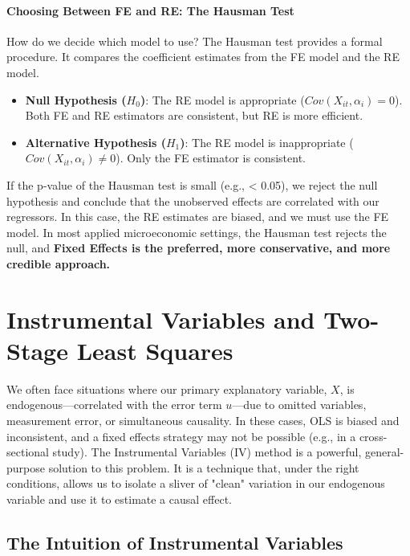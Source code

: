 \documentclass{article}
\providecommand{\tightlist}{
  \setlength{\itemsep}{0pt}
  \setlength{\parskip}{0pt}}
\begin{document}
\paragraph{Choosing Between FE and RE: The Hausman Test}
How do we decide which model to use? The 
Hausman test
 provides a formal procedure. It compares the coefficient estimates from the FE model and the RE model.
\begin{itemize}
    \tightlist
    \item \textbf{Null Hypothesis ($H_0$)}: The RE model is appropriate ($Cov(X_{it}, \alpha_i) = 0$). Both FE and RE estimators are consistent, but RE is more efficient.
    \item \textbf{Alternative Hypothesis ($H_1$)}: The RE model is inappropriate ($Cov(X_{it}, \alpha_i) \neq 0$). Only the FE estimator is consistent.
\end{itemize}
If the p-value of the Hausman test is small (e.g., < 0.05), we reject the null hypothesis and conclude that the unobserved effects are correlated with our regressors. In this case, the RE estimates are biased, and we must use the FE model. In most applied microeconomic settings, the Hausman test rejects the null, and \textbf{Fixed Effects is the preferred, more conservative, and more credible approach.}





\section{Instrumental Variables and Two-Stage Least Squares}
\label{sec:iv}

We often face situations where our primary explanatory variable, $X$, is endogenous—correlated with the error term $u$—due to omitted variables, measurement error, or simultaneous causality. In these cases, OLS is biased and inconsistent, and a fixed effects strategy may not be possible (e.g., in a cross-sectional study). The Instrumental Variables (IV) method is a powerful, general-purpose solution to this problem. It is a technique that, under the right conditions, allows us to isolate a sliver of "clean" variation in our endogenous variable and use it to estimate a causal effect.

\subsection{The Intuition of Instrumental Variables}
\label{sub:iv_intuition}
\end{document}
